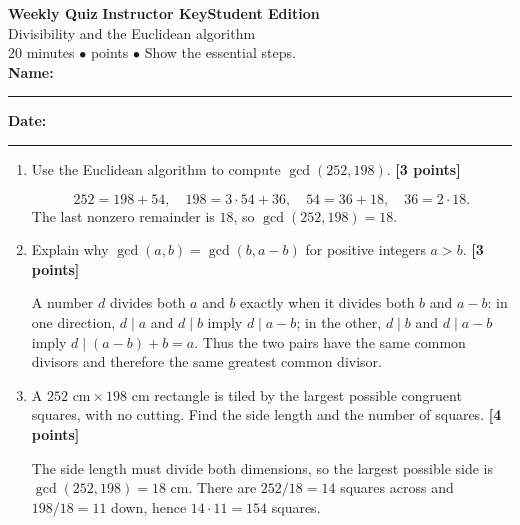 \documentclass[11pt]{article}
\newcounter{quiznum}
\newcommand{\edition}{\ifanswers Instructor Key\else Student Edition\fi}
\newcommand{\points}[1]{\hfill{\small\color{coral}\textbf{[#1 points]}}}
\newcommand{\quizheading}[1]{%
  \clearpage\stepcounter{quiznum}%
  \begin{tcolorbox}[
    enhanced,colback=paper,colframe=navy,boxrule=1.1pt,arc=2mm,
    left=4mm,right=4mm,top=2.5mm,bottom=2.5mm,
    borderline west={4pt}{0pt}{teal}]
    {\Large\bfseries\color{navy}Weekly Quiz \thequiznum}\hfill
    {\bfseries\color{teal}\edition}\\[-1pt]
    {\large\color{ink}#1}\\[2pt]
    {\small\color{muted}20 minutes \quad $\bullet$ \quad 10 points \quad $\bullet$ \quad Show the essential steps.}
    \ifanswers\else
      \\[5pt]\textbf{Name:}\ \rule{0.48\linewidth}{0.4pt}\hfill
      \textbf{Date:}\ \rule{0.20\linewidth}{0.4pt}
    \fi
  \end{tcolorbox}
}
\begin{document}
\quizheading{Divisibility and the Euclidean algorithm}
\begin{enumerate}
  \item Use the Euclidean algorithm to compute $\gcd(252,198)$. \points{3}
  \begin{solution}[1.05in]
    \[
    252=198+54,\quad 198=3\cdot54+36,\quad
    54=36+18,\quad 36=2\cdot18.
    \]
    The last nonzero remainder is $18$, so $\gcd(252,198)=18$.
  \end{solution}

  \item Explain why $\gcd(a,b)=\gcd(b,a-b)$ for positive integers $a>b$. \points{3}
  \begin{solution}[1.2in]
    A number $d$ divides both $a$ and $b$ exactly when it divides both $b$ and
    $a-b$: in one direction, $d\mid a$ and $d\mid b$ imply $d\mid a-b$; in the
    other, $d\mid b$ and $d\mid a-b$ imply $d\mid (a-b)+b=a$. Thus the two pairs
    have the same common divisors and therefore the same greatest common divisor.
  \end{solution}

  \item A $252\text{ cm}\times198\text{ cm}$ rectangle is tiled by the largest
  possible congruent squares, with no cutting. Find the side length and the number
  of squares. \points{4}
  \begin{solution}[1.5in]
    The side length must divide both dimensions, so the largest possible side is
    $\gcd(252,198)=18$ cm. There are $252/18=14$ squares across and $198/18=11$
    down, hence $14\cdot11=154$ squares.
  \end{solution}
\end{enumerate}
\end{document}
